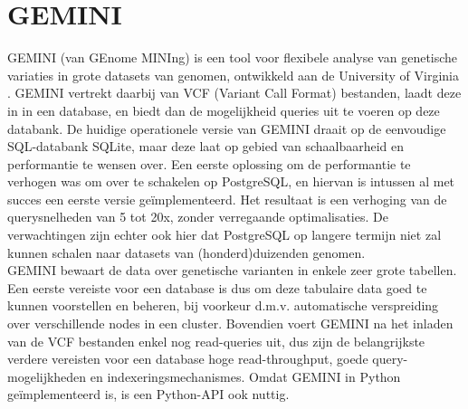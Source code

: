 \section{GEMINI}

GEMINI (van GEnome MINIng) is een tool voor flexibele analyse van genetische variaties in grote datasets van genomen, ontwikkeld aan de University of Virginia \cite{10.1371/journal.pcbi.1003153}. GEMINI vertrekt daarbij van VCF (Variant Call Format) bestanden, laadt deze in in een database, en biedt dan de mogelijkheid queries uit te voeren op deze databank. De huidige operationele versie van GEMINI draait op de eenvoudige SQL-databank SQLite, maar deze laat op gebied van schaalbaarheid en performantie te wensen over. Een eerste oplossing om de performantie te verhogen was om over te schakelen op PostgreSQL, en hiervan is intussen al met succes een eerste versie ge\"implementeerd. Het resultaat is een verhoging van de querysnelheden van 5 tot 20x, zonder verregaande optimalisaties. De verwachtingen zijn echter ook hier dat PostgreSQL op langere termijn niet zal kunnen schalen naar datasets van (honderd)duizenden genomen.\\
GEMINI bewaart de data over genetische varianten in enkele zeer grote tabellen. Een eerste vereiste voor een database is dus om deze tabulaire data goed te kunnen voorstellen en beheren, bij voorkeur d.m.v. automatische verspreiding over verschillende nodes in een cluster. Bovendien voert GEMINI na het inladen van de VCF bestanden enkel nog read-queries uit, dus zijn de belangrijkste verdere vereisten voor een database hoge read-throughput, goede query-mogelijkheden en indexeringsmechanismes. Omdat GEMINI in Python ge\"implementeerd is, is een Python-API ook nuttig. 



